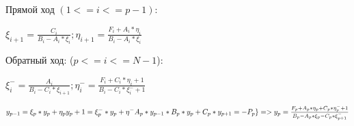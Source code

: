 \documentclass[12pt,a4paper]{scrartcl}
\begin{document}
\begin{enumerate}
\begin{enumerate}
			Прямой ход $ (1 <= i <= p - 1)$:
			
			$\xi_{i+1} = \frac{C_i}{B_i - A_i * \xi_i}; \eta_{i+1} = \frac{F_i + A_i * \eta_i}{B_i - A_i * \xi_i}$
			
			Обратный ход: ($p <= i <= N-1$):
			
			$\xi_i^- = \frac{A_i}{B_i - C_i * \xi_{i+1}}; \eta_i^- = \frac{F_i + C_i * \eta_i + 1}{B_i - C_i * \xi_i^- + 1}$
			
			\vspace{0.5cm}
			
			$ y_{p-1} = \xi_p * y_p + \eta_p \\ 
			y_p+1 = \xi_p^- * y_p + \eta^- \\
			A_p * y_{p-1} * B_p * y_p + C_p * y_{p+1} = -P_p \} => y_p = \frac{F_p + A_p * \eta_p + C_p * \eta_p^- + 1}{B_p - A_p * \xi_p - C_p * \xi_{p+1}^-}$ 
		\end{enumerate}
	\end{enumerate}
\end{document}
